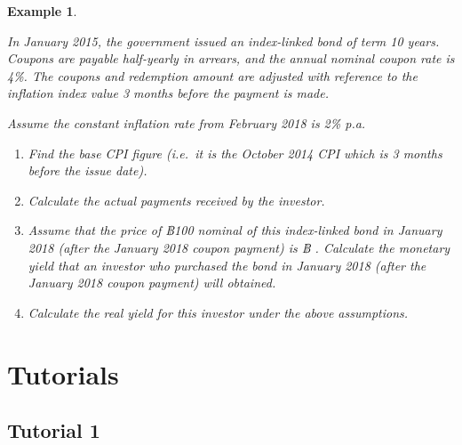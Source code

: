 \documentclass[
]{book}
\theoremstyle{definition}
\theoremstyle{definition}
\newtheorem{example}{Example}[chapter]
\theoremstyle{definition}
\theoremstyle{definition}
\theoremstyle{remark}
\begin{document}
\begin{example}
\protect\hypertarget{exm:exampleILB2}{}\label{exm:exampleILB2}

\emph{In January 2015, the government issued an index-linked bond of term 10
years. Coupons are payable half-yearly in arrears, and the annual
nominal coupon rate is 4\%. The coupons and redemption amount are
adjusted with reference to the inflation index value 3 months before the
payment is made.}

\emph{Assume the constant inflation rate from February 2018 is 2\% p.a.}

\begin{enumerate}
\def\labelenumi{\arabic{enumi}.}
\item
  \emph{Find the base CPI figure (i.e.~it is the October 2014 CPI which is
  3 months before the issue date).}
\item
  \emph{Calculate the actual payments received by the investor.}
\item
  \emph{Assume that the price of ฿100 nominal of this index-linked bond in
  January 2018 (after the January 2018 coupon payment) is ฿ .
  Calculate the monetary yield that an investor who purchased the bond
  in January 2018 (after the January 2018 coupon payment) will
  obtained.}
\item
  \emph{Calculate the real yield for this investor under the above
  assumptions.}
\end{enumerate}

\end{example}

\chapter{Tutorials}\label{tutorials}

\section{Tutorial 1}\label{tutorial-1}
\end{document}
